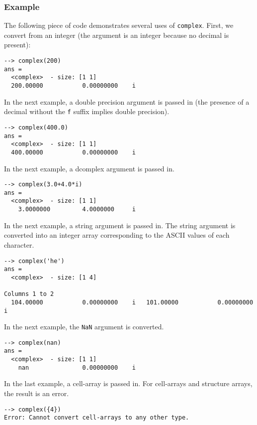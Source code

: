 \subsubsection{Example}
The following piece of code demonstrates several uses of \verb|complex|.  First, we convert from an integer (the argument is an integer because no decimal is present):
\begin{verbatim}
--> complex(200)
ans =
  <complex>  - size: [1 1]
  200.00000           0.00000000    i
\end{verbatim}
In the next example, a double precision argument is passed in (the presence of a decimal without the \verb|f| suffix implies double precision).
\begin{verbatim}
--> complex(400.0)
ans =
  <complex>  - size: [1 1]
  400.00000           0.00000000    i
\end{verbatim}
In the next example, a dcomplex argument is passed in. 
\begin{verbatim}
--> complex(3.0+4.0*i)
ans =
  <complex>  - size: [1 1]
    3.0000000         4.0000000     i
\end{verbatim}
In the next example, a string argument is passed in.  The string argument is converted into an integer array corresponding to the ASCII values of each character.
\begin{verbatim}
--> complex('he')
ans =
  <complex>  - size: [1 4]
  
Columns 1 to 2
  104.00000           0.00000000    i   101.00000           0.00000000    i
\end{verbatim}
In the next example, the \verb|NaN| argument is converted.
\begin{verbatim}
--> complex(nan)
ans =
  <complex>  - size: [1 1]
    nan               0.00000000    i
\end{verbatim}
In the last example, a cell-array is passed in.  For cell-arrays and structure arrays, the result is an error.
\begin{verbatim}
--> complex({4})
Error: Cannot convert cell-arrays to any other type.
\end{verbatim}
